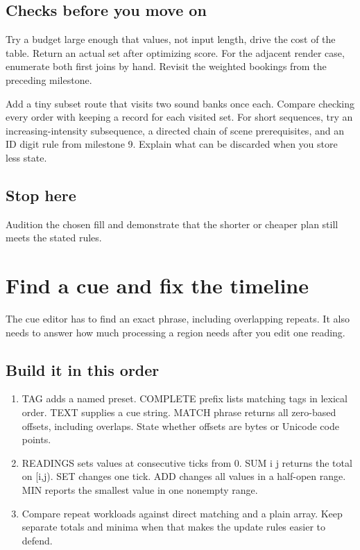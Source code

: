 \documentclass[11pt,letterpaper]{article}
\begin{document}
\subsection*{Checks before you move on}

Try a budget large enough that values, not input length, drive the cost of the table. Return an actual set after optimizing score. For the adjacent render case, enumerate both first joins by hand. Revisit the weighted bookings from the preceding milestone.

Add a tiny subset route that visits two sound banks once each. Compare checking every order with keeping a record for each visited set. For short sequences, try an increasing-intensity subsequence, a directed chain of scene prerequisites, and an ID digit rule from milestone 9. Explain what can be discarded when you store less state.

\subsection*{Stop here}

Audition the chosen fill and demonstrate that the shorter or cheaper plan still meets the stated rules.

\clearpage

\section{Find a cue and fix the timeline}\label{groovebox:07}

The cue editor has to find an exact phrase, including overlapping repeats. It also needs to answer how much processing a region needs after you edit one reading.

\subsection*{Build it in this order}

\begin{enumerate}
\item TAG adds a named preset. COMPLETE prefix lists matching tags in lexical order. TEXT supplies a cue string. MATCH phrase returns all zero-based offsets, including overlaps. State whether offsets are bytes or Unicode code points.
\item READINGS sets values at consecutive ticks from 0. SUM i j returns the total on [i,j). SET changes one tick. ADD changes all values in a half-open range. MIN reports the smallest value in one nonempty range.
\item Compare repeat workloads against direct matching and a plain array. Keep separate totals and minima when that makes the update rules easier to defend.
\end{enumerate}
\end{document}
